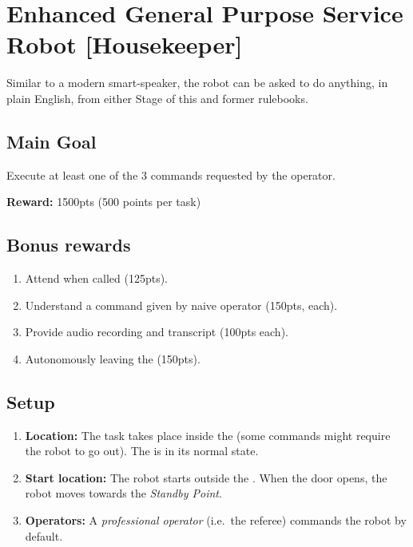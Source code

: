 \section{Enhanced General Purpose Service Robot [Housekeeper]}
\label{test:egpsr}
Similar to a modern smart-speaker, the robot can be asked to do anything, in plain English, from either Stage of this and former rulebooks.


\subsection*{Main Goal}
Execute at least one of the 3 commands requested by the operator.

\noindent\textbf{Reward:} 1500pts (500 points per task)\\

\subsection*{Bonus rewards}
\begin{enumerate}[nosep]
	\item Attend when called (125pts).
	\item Understand a command given by naive operator (150pts, each).
	\item Provide audio recording and transcript (100pts each).
	\item Autonomously leaving the \Arena{} (150pts).
\end{enumerate}

%
%
\subsection*{Setup}
\begin{enumerate}
	\item \textbf{Location:} The task takes place inside the \Arena{} (some commands might require the robot to go out). The \Arena{} is in its normal state.

	\item \textbf{Start location:} The robot starts outside the \Arena{}. When the door opens, the robot moves towards the \textit{Standby Point}.

	\item \textbf{Operators:} A \emph{professional operator} (i.e.~the referee) commands the robot by default.
\end{enumerate}

